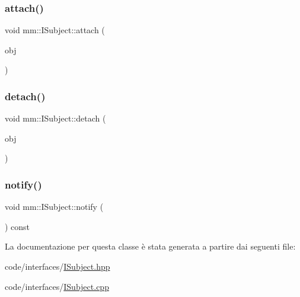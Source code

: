 \subsubsection{\texorpdfstring{attach()}{attach()}}
{\footnotesize\ttfamily void mm\+::\+I\+Subject\+::attach (\begin{DoxyParamCaption}\item[{\hyperlink{classmm_1_1_i_observer}{mm\+::\+I\+Observer} $\ast$}]{obj }\end{DoxyParamCaption})\hspace{0.3cm}{\ttfamily [noexcept]}}

\mbox{\label{classmm_1_1_i_subject_a64be1c0b2ad7ee4631a5270dedb7aa88}} 
\subsubsection{\texorpdfstring{detach()}{detach()}}
{\footnotesize\ttfamily void mm\+::\+I\+Subject\+::detach (\begin{DoxyParamCaption}\item[{\hyperlink{classmm_1_1_i_observer}{mm\+::\+I\+Observer} $\ast$}]{obj }\end{DoxyParamCaption})\hspace{0.3cm}{\ttfamily [noexcept]}}

\mbox{\label{classmm_1_1_i_subject_ad693fe5eb99bc20bc6d70f30bdf1140d}} 
\subsubsection{\texorpdfstring{notify()}{notify()}}
{\footnotesize\ttfamily void mm\+::\+I\+Subject\+::notify (\begin{DoxyParamCaption}{ }\end{DoxyParamCaption}) const}



La documentazione per questa classe è stata generata a partire dai seguenti file\+:\begin{DoxyCompactItemize}
\item 
code/interfaces/\hyperlink{_i_subject_8hpp}{I\+Subject.\+hpp}\item 
code/interfaces/\hyperlink{_i_subject_8cpp}{I\+Subject.\+cpp}\end{DoxyCompactItemize}
